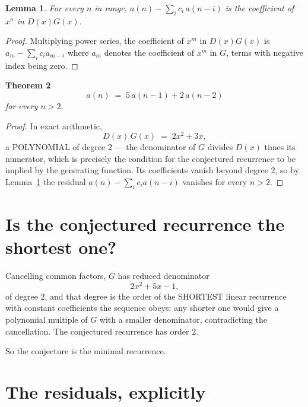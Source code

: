 \documentclass[11pt,a4paper]{article}
\theoremstyle{plain}
\newtheorem{theorem}{Theorem}
\newtheorem{lemma}[theorem]{Lemma}
\theoremstyle{definition}
\begin{document}
\begin{lemma}\label{lem:key}
For every $n$ in range, $a(n)-\sum_i c_i\,a(n-i)$ is the coefficient of $x^{n}$ in
$D(x)G(x)$.
\end{lemma}

\begin{proof}
Multiplying power series, the coefficient of $x^{m}$ in $D(x)G(x)$ is
$a_m-\sum_i c_i a_{m-i}$ where $a_m$ denotes the coefficient of $x^{m}$ in $G$, terms with
negative index being zero.
\end{proof}

\begin{theorem}
\[
a(n)\;=\;5\,a(n-1) + 2\,a(n-2)
\]
for every $n>2$.
\end{theorem}

\begin{proof}
In exact arithmetic,
\[
D(x)\,G(x)\;=\;2 x^{2} + 3 x,
\]
a POLYNOMIAL of degree $2$ --- the denominator of $G$ divides $D(x)$ times its numerator,
which is precisely the condition for the conjectured recurrence to be implied by the
generating function. Its coefficients vanish beyond degree $2$, so by
Lemma~\ref{lem:key} the residual $a(n)-\sum_ic_ia(n-i)$ vanishes for every
$n>2$.
\end{proof}

\section{Is the conjectured recurrence the shortest one?}

Cancelling common factors, $G$ has reduced denominator
\[
2 x^{2} + 5 x - 1,
\]
of degree $2$, and that degree is the order of the SHORTEST linear recurrence with
constant coefficients the sequence obeys: any shorter one would give a polynomial multiple of
$G$ with a smaller denominator, contradicting the cancellation. The conjectured recurrence has
order $2$.

So the conjecture is the minimal recurrence.

\section{The residuals, explicitly}
\end{document}
